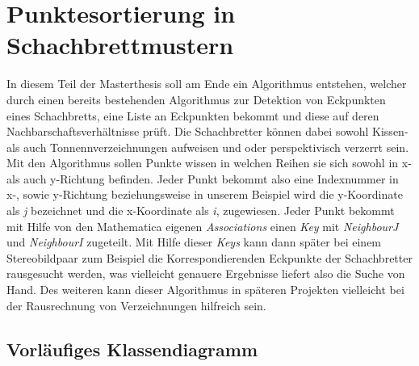 \chapter{Punktesortierung in Schachbrettmustern}
\label{sec:schachbrettAlg} 


In diesem Teil der Masterthesis soll am Ende ein Algorithmus entstehen, welcher durch einen bereits bestehenden Algorithmus zur Detektion von Eckpunkten eines Schachbretts, eine Liste an Eckpunkten bekommt und diese auf deren Nachbarschaftsverhältnisse prüft. Die Schachbretter können dabei sowohl Kissen- als auch Tonnennverzeichnungen aufweisen und oder perspektivisch verzerrt sein. Mit den Algorithmus sollen Punkte wissen in welchen Reihen sie sich sowohl in x- als auch y-Richtung befinden. Jeder Punkt bekommt also eine Indexnummer in x-, sowie y-Richtung beziehungsweise in unserem Beispiel wird die y-Koordinate als \textit{j} bezeichnet und die x-Koordinate als \textit{i}, zugewiesen. Jeder Punkt bekommt mit Hilfe von den Mathematica eigenen \textit{Associations} einen \textit{Key} mit \textit{NeighbourJ} und \textit{NeighbourI} zugeteilt. Mit Hilfe dieser \textit{Keys} kann dann später bei einem Stereobildpaar zum Beispiel die Korrespondierenden Eckpunkte der Schachbretter rausgesucht werden, was vielleicht genauere Ergebnisse liefert also die Suche von Hand. Des weiteren kann dieser Algorithmus in späteren Projekten vielleicht bei der Rausrechnung von Verzeichnungen hilfreich sein.\\

\section{Vorläufiges Klassendiagramm}

